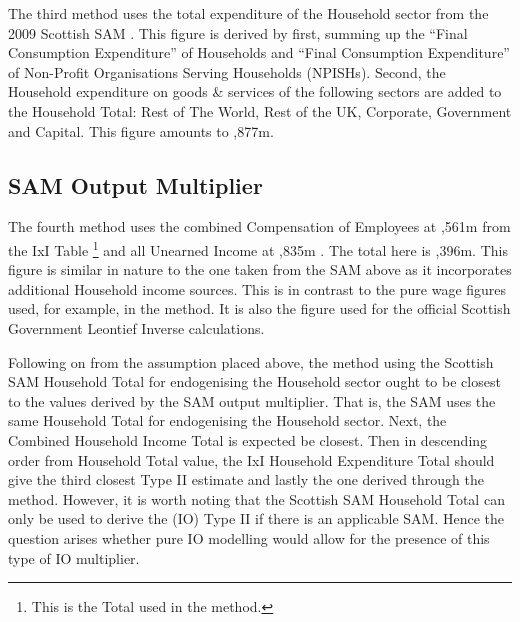 \begin{doublespacing}
The third method uses the total expenditure of the Household sector from the 2009 Scottish SAM \cite{SCOSAM}. This figure is derived by first, summing up the ``Final Consumption Expenditure'' of Households and ``Final Consumption Expenditure'' of Non-Profit Organisations Serving Households (NPISHs). Second, the Household expenditure on goods \& services of the following sectors are added to the Household Total: Rest of The World, Rest of the UK, Corporate, Government and Capital. This figure amounts to ,877m.

\subsection{SAM Output Multiplier}
\label{sec:4.4.4}

The fourth method uses the combined Compensation of Employees at ,561m from the IxI Table \footnote{ This is the Total used in the  method.} \cite{ScottishGovernment2013a} and all Unearned Income at ,835m \cite{ScotGov2013c}. The total here is ,396m. This figure is similar in nature to the one taken from the SAM above as it incorporates additional Household income sources. This is in contrast to the pure wage figures used, for example, in the  method. It is also the figure used for the official Scottish Government Leontief Inverse calculations.

\bigskip

Following on from the assumption placed above, the method using the Scottish SAM Household Total for endogenising the Household sector ought to be closest to the values derived by the SAM output multiplier. That is, the SAM uses the same Household Total for endogenising the Household sector. Next, the Combined Household Income Total is expected be closest. Then in descending order from Household Total value, the IxI Household Expenditure Total should give the third closest Type II estimate and lastly the one derived through the  method. However, it is worth noting that the Scottish SAM Household Total can only be used to derive the (IO) Type II if there is an applicable SAM. Hence the question arises whether pure IO modelling would allow for the presence of this type of IO multiplier.





\end{doublespacing}
